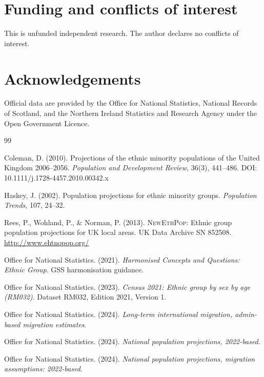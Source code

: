 \documentclass[12pt,a4paper]{article}
\begin{document}
\section*{Funding and conflicts of interest}

This is unfunded independent research. The author declares no conflicts of interest.

\section*{Acknowledgements}

Official data are provided by the Office for National Statistics, National Records of Scotland,
and the Northern Ireland Statistics and Research Agency under the Open Government Licence.


\begin{thebibliography}{99}

Coleman, D. (2010).
Projections of the ethnic minority populations of the United Kingdom 2006--2056.
\emph{Population and Development Review}, 36(3), 441--486.
DOI: 10.1111/j.1728-4457.2010.00342.x

Haskey, J. (2002).
Population projections for ethnic minority groups.
\emph{Population Trends}, 107, 24--32.

Rees, P., Wohland, P., \& Norman, P. (2013).
\textsc{NewEthPop}: Ethnic group population projections for UK local areas.
UK Data Archive SN 852508. \url{http://www.ehtnopop.org/}

Office for National Statistics. (2021).
\emph{Harmonised Concepts and Questions: Ethnic Group}.
GSS harmonisation guidance.

Office for National Statistics. (2023).
\emph{Census 2021: Ethnic group by sex by age (RM032)}.
Dataset RM032, Edition 2021, Version 1.

Office for National Statistics. (2024).
\emph{Long-term international migration, admin-based migration estimates}.

Office for National Statistics. (2024).
\emph{National population projections, 2022-based}.

Office for National Statistics. (2024).
\emph{National population projections, migration assumptions: 2022-based}.


\end{thebibliography}
\end{document}
